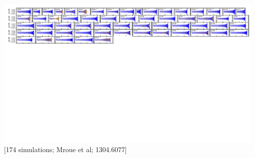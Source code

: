 {\begin{columns}
\begin{column}{.48\textwidth}
\begin{center}
    \includegraphics[width=\textwidth]{pictures/catalog.pdf} \\ 
{\tiny [174 simulations; Mroue et al; 1304.6077]}
\end{center}
  \end{column}

\end{columns}


}


